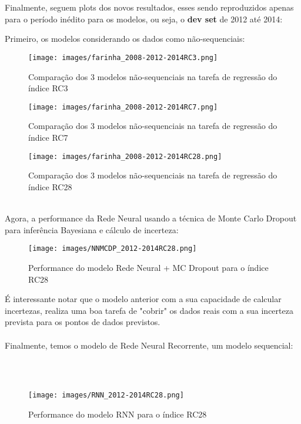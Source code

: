\documentclass[a4paper]{article}
\begin{document}
\\
\\

Finalmente, seguem plots dos novos resultados, esses sendo reproduzidos apenas para o período inédito para os modelos, ou seja, o \textbf{dev set} de 2012 até 2014:


\bigskip
Primeiro, os modelos considerando os dados como não-sequenciais:

\begin{figure}[H]
\centering
\texttt{[image: images/farinha\_2008-2012-2014RC3.png]}
\caption{Comparação dos 3 modelos não-sequenciais na tarefa de regressão do índice RC3}
\end{figure}

\begin{figure}[H]
\centering
\texttt{[image: images/farinha\_2008-2012-2014RC7.png]}
\caption{Comparação dos 3 modelos não-sequenciais na tarefa de regressão do índice RC7}
\end{figure}

\begin{figure}[H]
\centering
\texttt{[image: images/farinha\_2008-2012-2014RC28.png]}
\caption{Comparação dos 3 modelos não-sequenciais na tarefa de regressão do índice RC28}
\end{figure}

\\

Agora, a performance da Rede Neural usando a técnica de Monte Carlo Dropout para inferência Bayesiana e cálculo de incerteza:


\begin{figure}[H]
\centering
\texttt{[image: images/NNMCDP\_2012-2014RC28.png]}
\caption{Performance do modelo Rede Neural + MC Dropout para o índice RC28}
\end{figure}


É interessante notar que o modelo anterior com a sua capacidade de calcular incertezas, realiza uma boa tarefa de "cobrir" os dados reais com a sua incerteza prevista para os pontos de dados previstos.
 \\
 \\

Finalmente, temos o modelo de Rede Neural Recorrente, um modelo sequencial:

\\ 
\\

\begin{figure}[H]
\centering
\texttt{[image: images/RNN\_2012-2014RC28.png]}
\caption{Performance do modelo RNN para o índice RC28}
\end{figure}
\end{document}

